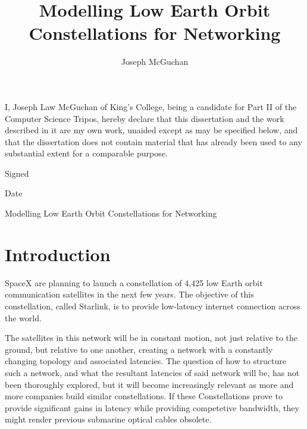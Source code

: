 \documentclass[12pt]{article}
\begin{document}
\title{Modelling Low Earth Orbit Constellations for Networking}
\author{Joseph McGuchan}
\maketitle
\thispagestyle{empty}


\newpage


I, Joseph Law McGuchan of King's College, being a candidate for Part II of the Computer Science Tripos, hereby declare that this dissertation and the work described in it are my own work, unaided except as may be specified below, and that the dissertation does not contain material that has already been used to any substantial extent for a comparable purpose.

Signed %

Date %

\newpage


Modelling Low Earth Orbit Constellations for Networking

\newpage

\tableofcontents

\section{Introduction}

SpaceX are planning to launch a constellation of 4,425 low Earth orbit communication satellites in the next few years. The objective of this constellation, called Starlink, is to provide low-latency internet connection across the world.

The satellites in this network will be in constant motion, not just relative to the ground, but relative to one another, creating a network with a constantly changing topology and associated latencies. The question of how to structure such a network, and what the resultant latencies of said network will be, has not been thoroughly explored, but it will become increasingly relevant as more and more companies build similar constellations. If these Constellations prove to provide significant gains in latency while providing competetive bandwidth, they might render previous submarine optical cables obsolete.
\end{document}
